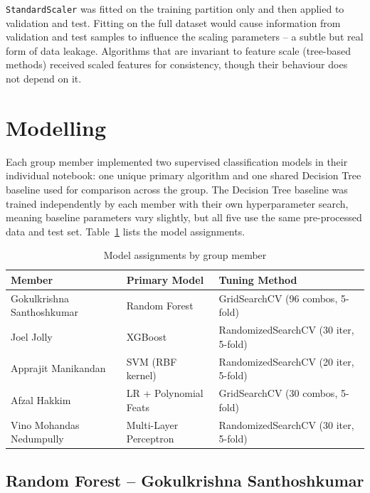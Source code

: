 \documentclass[12pt,a4paper]{article}
\begin{document}
\texttt{StandardScaler} was fitted on the training partition only and then applied to validation and test. Fitting on the full dataset would cause information from validation and test samples to influence the scaling parameters -- a subtle but real form of data leakage. Algorithms that are invariant to feature scale (tree-based methods) received scaled features for consistency, though their behaviour does not depend on it.

\section{Modelling}
\label{sec:modelling}

Each group member implemented two supervised classification models in their individual notebook: one unique primary algorithm and one shared Decision Tree baseline used for comparison across the group. The Decision Tree baseline was trained independently by each member with their own hyperparameter search, meaning baseline parameters vary slightly, but all five use the same pre-processed data and test set. Table~\ref{tab:modelsummary} lists the model assignments.

\begin{table}[H]
  \centering
  \caption{Model assignments by group member}
  \label{tab:modelsummary}
  \begin{tabular}{lll}
    \toprule
    \textbf{Member} & \textbf{Primary Model} & \textbf{Tuning Method} \\
    \midrule
    Gokulkrishna Santhoshkumar & Random Forest         & GridSearchCV (96 combos, 5-fold) \\
    Joel Jolly                 & XGBoost               & RandomizedSearchCV (30 iter, 5-fold) \\
    Apprajit Manikandan        & SVM (RBF kernel)      & RandomizedSearchCV (20 iter, 5-fold) \\
    Afzal Hakkim               & LR + Polynomial Feats & GridSearchCV (30 combos, 5-fold) \\
    Vino Mohandas Nedumpully   & Multi-Layer Perceptron & RandomizedSearchCV (30 iter, 5-fold) \\
    \bottomrule
  \end{tabular}
\end{table}

\subsection{Random Forest -- Gokulkrishna Santhoshkumar}
\label{subsec:rf}
\end{document}
